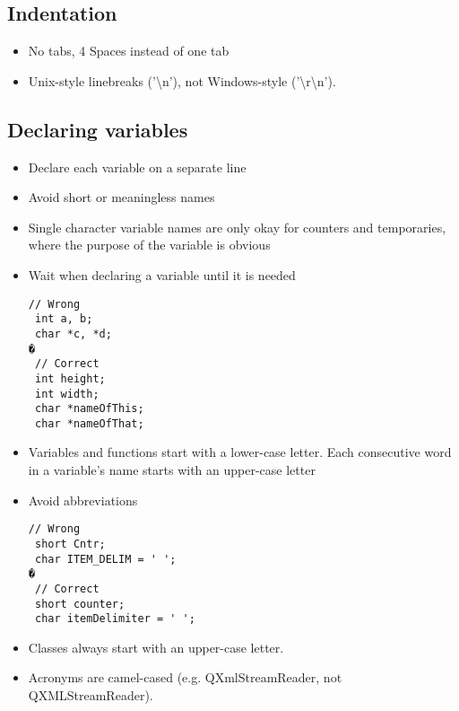 \documentclass[a4paper,12pt]{article}
\begin{document}
\subsection{Indentation}
\begin{itemize}
\item No tabs, 4 Spaces instead of one tab
\item Unix-style linebreaks ('\textbackslash n'), not Windows-style ('\textbackslash r\textbackslash n').
\end{itemize}


\subsection{Declaring variables}

\begin{itemize}
\item  Declare each variable on a separate line
\item  Avoid short or meaningless names
\item  Single character variable names are only okay for counters and temporaries, where the purpose of the variable is obvious
\item  Wait when declaring a variable until it is needed
\begin{lstlisting}[breaklines]
// Wrong
 int a, b;
 char *c, *d;
�
 // Correct
 int height;
 int width;
 char *nameOfThis;
 char *nameOfThat;
 \end{lstlisting}
\item  Variables and functions start with a lower-case letter. Each consecutive word in a variable's name starts with an upper-case letter
\item  Avoid abbreviations
\begin{lstlisting}[breaklines]
 // Wrong
 short Cntr;
 char ITEM_DELIM = ' ';
�
 // Correct
 short counter;
 char itemDelimiter = ' ';
 \end{lstlisting}
\item  Classes always start with an upper-case letter. 
\item  Acronyms are camel-cased (e.g. QXmlStreamReader, not QXMLStreamReader).
\end{itemize}

\end{document}
